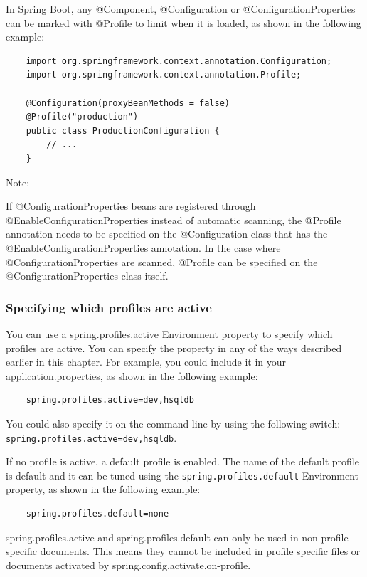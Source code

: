\documentclass{scrartcl}
\begin{document}
In Spring Boot, any @Component, @Configuration or @ConfigurationProperties can be marked with @Profile to limit when it is loaded, as shown in the following example:

\begin{lstlisting}
    import org.springframework.context.annotation.Configuration;
    import org.springframework.context.annotation.Profile;

    @Configuration(proxyBeanMethods = false)
    @Profile("production")
    public class ProductionConfiguration {
        // ...
    }
\end{lstlisting}

Note:

If @ConfigurationProperties beans are registered through @EnableConfigurationProperties instead of automatic scanning, the @Profile annotation needs to be specified on the @Configuration class that has the @EnableConfigurationProperties annotation. In the case where @ConfigurationProperties are scanned, @Profile can be specified on the @ConfigurationProperties class itself.

\subsubsection{Specifying which profiles are active}

You can use a spring.profiles.active Environment property to specify which profiles are active. You can specify the property in any of the ways described earlier in this chapter. For example, you could include it in your application.properties, as shown in the following example:

\begin{lstlisting}
    spring.profiles.active=dev,hsqldb
\end{lstlisting}


You could also specify it on the command line by using the following switch: \lstinline|--spring.profiles.active=dev,hsqldb|.

If no profile is active, a default profile is enabled. The name of the default profile is default and it can be tuned using the \lstinline|spring.profiles.default| Environment property, as shown in the following example:


\begin{lstlisting}
    spring.profiles.default=none
\end{lstlisting}

spring.profiles.active and spring.profiles.default can only be used in non-profile-specific documents. This means they cannot be included in profile specific files or documents activated by spring.config.activate.on-profile.
\end{document}
